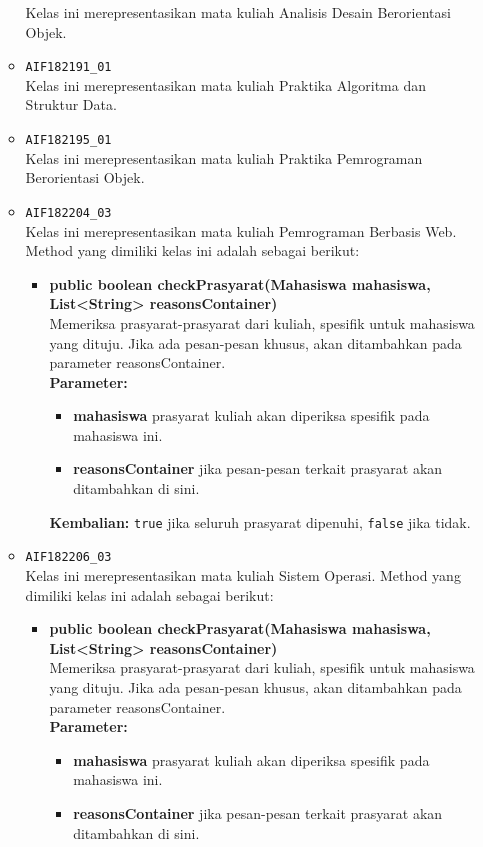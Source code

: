 \begin{enumerate}
\begin{itemize}
		Kelas ini merepresentasikan mata kuliah Analisis Desain Berorientasi  Objek.
		\item \texttt{AIF182191\_01} \\
		Kelas ini merepresentasikan mata kuliah Praktika Algoritma dan Struktur Data.
		\item \texttt{AIF182195\_01} \\
		Kelas ini merepresentasikan mata kuliah Praktika Pemrograman Berorientasi Objek.
		\item \texttt{AIF182204\_03} \\
		Kelas ini merepresentasikan mata kuliah Pemrograman Berbasis Web. Method yang dimiliki kelas ini adalah sebagai berikut: 
		\begin{itemize}
			\item \textbf{public boolean checkPrasyarat(Mahasiswa mahasiswa, List<String> reasonsContainer)}\\
			Memeriksa prasyarat-prasyarat dari kuliah, spesifik untuk mahasiswa yang dituju. Jika ada pesan-pesan khusus, akan ditambahkan pada parameter reasonsContainer.\\
			\textbf{Parameter:}
			\begin{itemize}
				\item \textbf{mahasiswa} prasyarat kuliah akan diperiksa spesifik pada mahasiswa ini.
				\item \textbf{reasonsContainer} jika pesan-pesan terkait prasyarat akan ditambahkan di sini.
			\end{itemize}
			\textbf{Kembalian:} \texttt{true} jika seluruh prasyarat dipenuhi, \texttt{false} jika tidak.
		\end{itemize}
		\item \texttt{AIF182206\_03} \\
		Kelas ini merepresentasikan mata kuliah Sistem Operasi. Method yang dimiliki kelas ini adalah sebagai berikut: 
		\begin{itemize}
			\item \textbf{public boolean checkPrasyarat(Mahasiswa mahasiswa, List<String> reasonsContainer)}\\
			Memeriksa prasyarat-prasyarat dari kuliah, spesifik untuk mahasiswa yang dituju. Jika ada pesan-pesan khusus, akan ditambahkan pada parameter reasonsContainer.\\
			\textbf{Parameter:}
			\begin{itemize}
				\item \textbf{mahasiswa} prasyarat kuliah akan diperiksa spesifik pada mahasiswa ini.
				\item \textbf{reasonsContainer} jika pesan-pesan terkait prasyarat akan ditambahkan di sini.

\end{itemize}
\end{itemize}
\end{itemize}
\end{enumerate}
